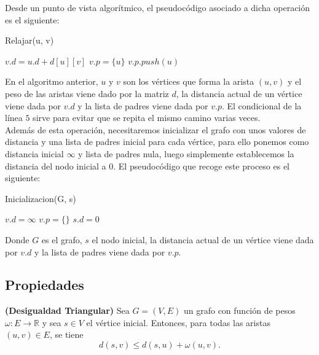 Desde un punto de vista algorítmico, el pseudocódigo asociado a dicha operación es el siguiente:

\begin{breakablealgorithm}
	\caption{Relajar(u, v)}
	\begin{algorithmic}[1]
			\State $v.d = u.d + d[u][v]$
			\State $v.p = \{u\}$
				\State $v.p.push(u)$
			\EndIf
		\EndIf
	\end{algorithmic}
\end{breakablealgorithm}

En el algoritmo anterior, $u$ y $v$ son los vértices que forma la arista $(u,v)$ y el peso de las aristas viene dado por la matriz $d$, la distancia actual de un vértice viene dada por $v.d$ y la lista de padres viene dada por $v.p$. El condicional de la línea $5$ sirve para evitar que se repita el mismo camino varias veces.\\

Además de esta operación, necesitaremos inicializar el grafo con unos valores de distancia y una lista de padres inicial para cada vértice, para ello ponemos como distancia inicial $\infty$ y lista de padres nula, luego simplemente establecemos la distancia del nodo inicial a $0$. El pseudocódigo que recoge este proceso es el siguiente:

\begin{breakablealgorithm}
	\caption{Inicializacion(G, s)}
	\begin{algorithmic}[1]
			\State $v.d = \infty$
			\State $v.p = \{\}$
		\EndFor
		\State $s.d = 0$
	\end{algorithmic}
\end{breakablealgorithm}

Donde $G$ es el grafo, $s$ el nodo inicial, la distancia actual de un vértice viene dada por $v.d$ y la lista de padres viene dada por $v.p$. \\

\subsection{Propiedades}

\begin{lema}\label{lema:des_tri}
	\textbf{(Desigualdad Triangular)} Sea $G=(V,E)$ un grafo con función de pesos $\omega : E\rightarrow \mathbb{R}$ y sea $s\in V$ el vértice inicial. Entonces, para todas las aristas $(u,v)\in E$, se tiene
	$$d(s,v)\leq d(s,u)+\omega (u,v).$$
\end{lema}

